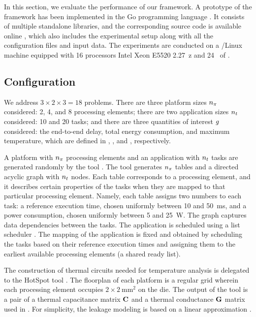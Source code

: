 In this section, we evaluate the performance of our framework. A prototype of
the framework has been implemented in the Go programming language \cite{go}. It
consists of multiple standalone libraries, and the corresponding source code is
available online \cite{sources}, which also includes the experimental setup
along with all the configuration files and input data. The experiments are
conducted on a /Linux machine equipped with 16 processors Intel Xeon
E5520 2.27~z and 24~ of .

\subsection{Configuration}

We address $3 \times 2 \times 3 = 18$ problems. There are three platform sizes
${n_\pi}$ considered: 2, 4, and 8 processing elements; there are two application
sizes ${n_t}$ considered: 10 and 20 tasks; and there are three quantities of
interest $g$ considered: the end-to-end delay, total energy consumption, and
maximum temperature, which are defined in ,
, and , respectively.

A platform with ${n_\pi}$ processing elements and an application with ${n_t}$ tasks
are generated randomly by the  tool \cite{dick1998}. The tool generates
${n_\pi}$ tables and a directed acyclic graph with ${n_t}$ nodes. Each table
corresponds to a processing element, and it describes certain properties of the
tasks when they are mapped to that particular processing element. Namely, each
table assigns two numbers to each task: a reference execution time, chosen
uniformly between 10 and 50~ms, and a power consumption, chosen uniformly
between 5 and 25~W. The graph captures data dependencies between the tasks. The
application is scheduled using a list scheduler \cite{adam1974}. The mapping of
the application is fixed and obtained by scheduling the tasks based on their
reference execution times and assigning them to the earliest available
processing elements (a shared ready list).

The construction of thermal  circuits needed for temperature analysis is
delegated to the HotSpot tool \cite{skadron2004}. The floorplan of each platform
is a regular grid wherein each processing element occupies $2 \times
2~\text{mm}^2$ on the die. The output of the tool is a pair of a thermal
capacitance matrix $\mathbf{C}$ and a thermal conductance $\mathbf{G}$ matrix used in
. For simplicity, the leakage modeling is based on a linear
approximation \cite{yang2013, ukhov2012, liu2007}.

